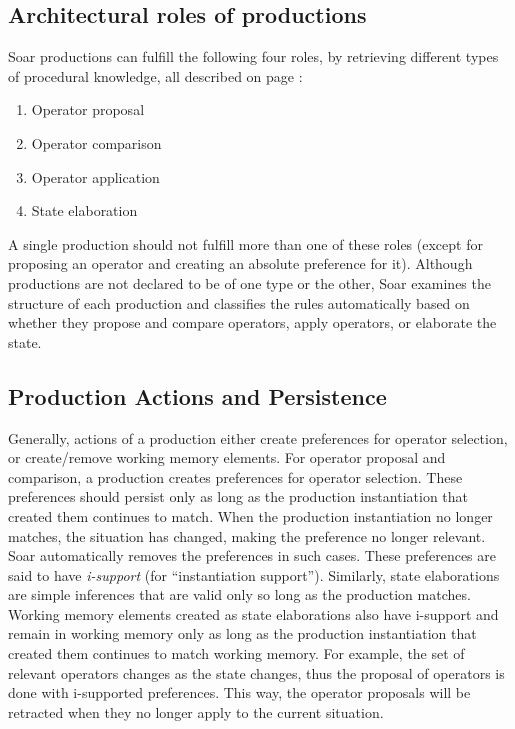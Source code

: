 \subsection{Architectural roles of productions}
\label{ARCH-pm-roles}

Soar productions can fulfill the following four roles, by retrieving different types of procedural knowledge, all described on page \pageref{LIST:4KnowledgeTypes}:

\vspace{-12pt}
\begin{enumerate}
	\item Operator proposal
	\vspace{-6pt}
	\item Operator comparison
	\vspace{-6pt}
	\item Operator application
	\vspace{-6pt}
	\item State elaboration
	\vspace{-6pt}
\end{enumerate}

A single production should not fulfill more than one of these roles (except for proposing an operator and creating an absolute preference for it). Although productions are not declared to be of one type or the other, Soar examines the structure of each production and classifies the rules automatically based on whether they propose and compare operators, apply operators, or elaborate the state.

\subsection{Production Actions and Persistence}
\label{ARCH-prefmem-persistence}
\label{PAGE:O-support}

Generally, actions of a production either create preferences for operator selection, or create/remove working memory elements.  For operator proposal and comparison, a production creates preferences for operator selection.  These preferences should persist only as long as the production instantiation that created them continues to match.  When the production instantiation no longer matches, the situation has changed, making the preference no longer relevant.  Soar automatically removes the preferences in such cases.  These preferences are said to have \emph{i-support} (for ``instantiation support'').  Similarly, state elaborations are simple inferences that are valid only so long as the production matches.  Working memory elements created as state elaborations also have i-support and remain in working memory only as long as the production instantiation that created them continues to match working memory.  For example, the set of relevant operators changes as the state changes, thus the proposal of operators is done with i-supported preferences. This way, the operator proposals will be retracted when they no longer apply to the current situation.

